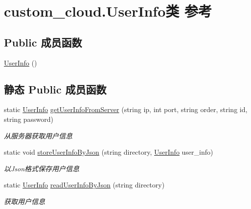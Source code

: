 \hypertarget{classcustom__cloud_1_1_user_info}{}\section{custom\+\_\+cloud.\+User\+Info类 参考}
\label{classcustom__cloud_1_1_user_info}
\subsection*{Public 成员函数}
\begin{DoxyCompactItemize}
\item 
\hyperlink{classcustom__cloud_1_1_user_info_a13e5af80bddb7fe0eff2b7414988a277}{User\+Info} ()
\end{DoxyCompactItemize}
\subsection*{静态 Public 成员函数}
\begin{DoxyCompactItemize}
\item 
static \hyperlink{classcustom__cloud_1_1_user_info}{User\+Info} \hyperlink{classcustom__cloud_1_1_user_info_a1da7fb72baa3ae45811d3ae3ba218f65}{get\+User\+Info\+From\+Server} (string ip, int port, string order, string id, string password)
\begin{DoxyCompactList}\small\item\em 从服务器获取用户信息 \end{DoxyCompactList}\item 
static void \hyperlink{classcustom__cloud_1_1_user_info_a79ce1b1481f668ab112d2e51d46499ec}{store\+User\+Info\+By\+Json} (string directory, \hyperlink{classcustom__cloud_1_1_user_info}{User\+Info} user\+\_\+info)
\begin{DoxyCompactList}\small\item\em 以\+Json格式保存用户信息 \end{DoxyCompactList}\item 
static \hyperlink{classcustom__cloud_1_1_user_info}{User\+Info} \hyperlink{classcustom__cloud_1_1_user_info_ae6ff14e98ef2b7b35cbe26f66dc7793e}{read\+User\+Info\+By\+Json} (string directory)
\begin{DoxyCompactList}\small\item\em 获取用户信息 \end{DoxyCompactList}\end{DoxyCompactItemize}
